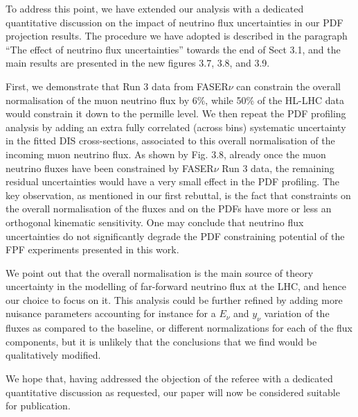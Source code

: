 \documentclass[11pt,a4paper]{article}
\begin{document}
To address this point, we have extended our analysis with a dedicated quantitative discussion on the impact of neutrino flux uncertainties in our PDF projection results.
%
The procedure we have adopted is described in the paragraph ``The effect of neutrino flux uncertainties'' towards the end of Sect 3.1, and the main results are presented in the new figures 3.7, 3.8, and 3.9.

First, we demonstrate that Run 3 data from FASER$\nu$ can constrain the overall normalisation of the muon neutrino flux by 6\%, while 50\% of the HL-LHC data would constrain it down to the permille level.
%
We then repeat the PDF profiling analysis by adding an extra fully correlated (across bins) systematic uncertainty in the fitted DIS cross-sections, associated to this overall normalisation of the incoming muon neutrino flux.
%
As shown by Fig. 3.8, already once the muon neutrino fluxes have been constrained by FASER$\nu$ Run 3 data, the remaining residual uncertainties would have a very small effect in the PDF profiling.
%
The key observation, as mentioned in our first rebuttal, is the fact that constraints on the overall normalisation of the fluxes and on the PDFs have more or less an orthogonal kinematic sensitivity.
%
One may conclude that neutrino flux uncertainties do not significantly degrade the PDF constraining potential of the FPF experiments presented in this work.

We point out that the overall normalisation is the main source of theory uncertainty in the modelling of far-forward neutrino flux at the LHC, and hence our choice to focus on it.
%
This analysis could be further refined by adding more nuisance parameters accounting for instance for a $E_\nu$ and $y_\nu$ variation of the fluxes as compared to the baseline, or different normalizations for each of the flux components, but it is unlikely that the conclusions that we find would be qualitatively modified.
%


We hope that, having addressed the objection of the referee with a dedicated quantitative discussion as requested, our paper will now be considered suitable for publication.




\end{document}
